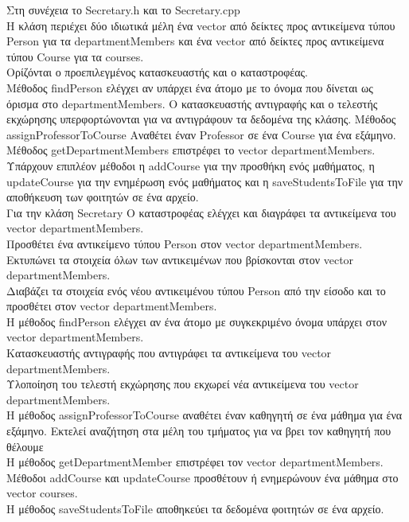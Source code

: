 \documentclass[12pt]{article}
\begin{document}
Στη συνέχεια το Secretary.h και το Secretary.cpp\\
Η κλάση περιέχει δύο ιδιωτικά μέλη ένα vector από δείκτες προς αντικείμενα τύπου Person για τα departmentMembers και ένα vector από δείκτες προς αντικείμενα τύπου Course για τα courses.\\
Ορίζόνται ο προεπιλεγμένος κατασκευαστής και ο καταστροφέας.\\
Μέθοδος findPerson ελέγχει αν υπάρχει ένα άτομο με το όνομα που δίνεται ως όρισμα στο departmentMembers.
Ο κατασκευαστής αντιγραφής και ο τελεστής εκχώρησης υπερφορτώνονται για να αντιγράφουν τα δεδομένα της κλάσης.
Μέθοδος assignProfessorToCourse Αναθέτει έναν Professor σε ένα Course για ένα εξάμηνο.\\
Μέθοδος getDepartmentMembers επιστρέφει το vector departmentMembers.\\
Υπάρχουν επιπλέον μέθοδοι η addCourse για την προσθήκη ενός μαθήματος, η updateCourse για την ενημέρωση ενός μαθήματος και η saveStudentsToFile για την αποθήκευση των φοιτητών σε ένα αρχείο.\\

Για την κλάση Secretary
Ο καταστροφέας ελέγχει και διαγράφει τα αντικείμενα του vector departmentMembers.\\
Προσθέτει ένα αντικείμενο τύπου Person στον vector departmentMembers.\\
Εκτυπώνει τα στοιχεία όλων των αντικειμένων που βρίσκονται στον vector departmentMembers.\\
Διαβάζει τα στοιχεία ενός νέου αντικειμένου τύπου Person από την είσοδο και το προσθέτει στον vector departmentMembers.\\
Η μέθοδος findPerson ελέγχει αν ένα άτομο με συγκεκριμένο όνομα υπάρχει στον vector departmentMembers.\\
Κατασκευαστής αντιγραφής που αντιγράφει τα αντικείμενα του vector departmentMembers.\\
Υλοποίηση του τελεστή εκχώρησης που εκχωρεί νέα αντικείμενα του vector departmentMembers.\\
Η μέθοδος assignProfessorToCourse αναθέτει έναν καθηγητή σε ένα μάθημα για ένα εξάμηνο. Εκτελεί αναζήτηση στα μέλη του τμήματος για να βρει τον καθηγητή που θέλουμε\\
Η μέθοδος getDepartmentMember επιστρέφει τον vector departmentMembers.\\
Μέθοδοι addCourse και updateCourse προσθέτουν ή ενημερώνουν ένα μάθημα στο vector courses.\\
Η μέθοδος saveStudentsToFile αποθηκεύει τα δεδομένα φοιτητών σε ένα αρχείο.\\
\end{document}
